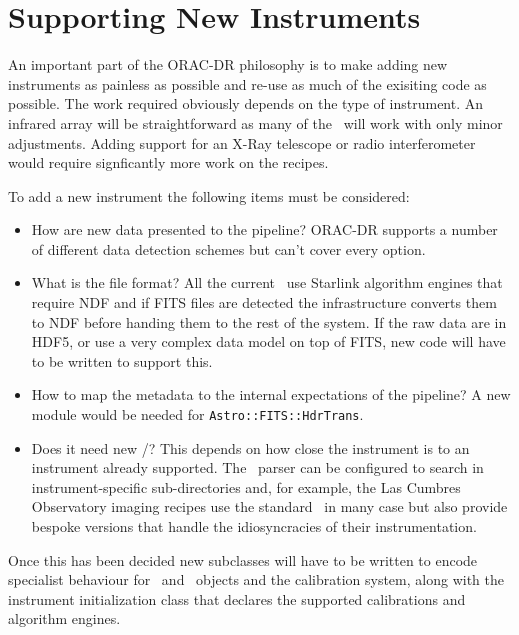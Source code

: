\documentclass[final,authoryear,5p,times,twocolumn]{elsarticle}
\begin{document}
\section{Supporting New Instruments}

An important part of the ORAC-DR philosophy is to make adding new
instruments as painless as possible and re-use as much of the
exisiting code as possible. The work required obviously depends on the
type of instrument. An infrared array will be straightforward as many
of the \recipes\ will work with only minor adjustments. Adding support
for an X-Ray telescope or radio interferometer would require
signficantly more work on the recipes.

To add a new instrument the following items must be considered:

\begin{itemize}

\item How are new data presented to the pipeline? ORAC-DR supports a
  number of different data detection schemes but can't cover every option.

\item What is the file format? All the current \recipes\ use Starlink
  algorithm engines that require NDF \citep{ndfjenness} and if FITS
  files are detected the infrastructure converts them to NDF before
  handing them to the rest of the system. If the raw data are in HDF5,
  or use a very complex data model on top of FITS, new code will have
  to be written to support this.

\item How to map the metadata to the internal expectations of the
  pipeline? A new module would be needed for \texttt{Astro::FITS::HdrTrans}.

\item Does it need new \recipes/\primitives? This depends on how close
  the instrument is to an instrument already supported. The \recipe\
  parser can be configured to search in instrument-specific
  sub-directories and, for example, the Las Cumbres Observatory
  imaging recipes use the standard \primitives\ in many case but also
  provide bespoke versions that handle the idiosyncracies of their
  instrumentation.

\end{itemize}

Once this has been decided new subclasses will have to be written to
encode specialist behaviour for \Frame\ and \Group\ objects and the
calibration system, along with the instrument initialization class
that declares the supported calibrations and algorithm engines.
\end{document}
